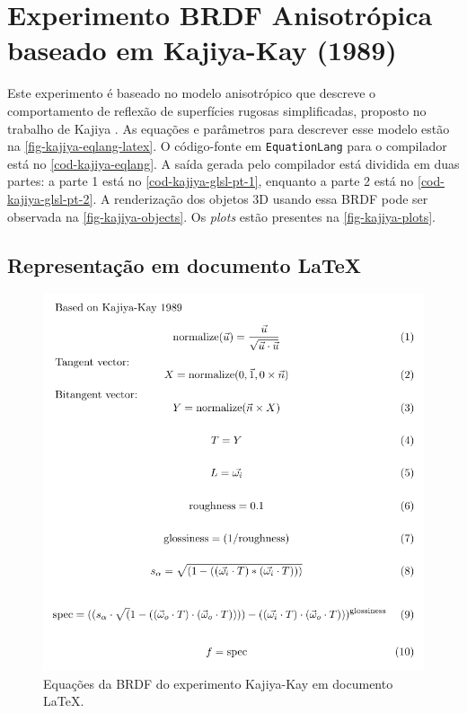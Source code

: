
\section{Experimento BRDF Anisotrópica baseado em Kajiya-Kay (1989)}

Este experimento é baseado no modelo anisotrópico que descreve o comportamento de reflexão de superfícies rugosas simplificadas, proposto no trabalho de Kajiya \cite{kajiya1985anisotropic}. As equações e parâmetros para descrever esse modelo estão na \autoref{fig-kajiya-eqlang-latex}. O código-fonte em \texttt{EquationLang} para o compilador está no \autoref{cod-kajiya-eqlang}. A saída gerada pelo compilador está dividida em duas partes: a parte 1 está no \autoref{cod-kajiya-glsl-pt-1}, enquanto a parte 2 está no \autoref{cod-kajiya-glsl-pt-2}. A renderização dos objetos 3D usando essa BRDF pode ser observada na \autoref{fig-kajiya-objects}. Os \textit{plots} estão presentes na \autoref{fig-kajiya-plots}.

\subsection{Representação em documento \LaTeX{}}
\begin{figure}[H]
    \caption{\label{fig-kajiya-eqlang-latex} \small Equações da BRDF do experimento Kajiya-Kay em documento \LaTeX{}.}
    \begin{center}
        \includegraphics[scale=0.92]{./Imagens/brdfs/aniso.pdf}
    \end{center}
\end{figure}


